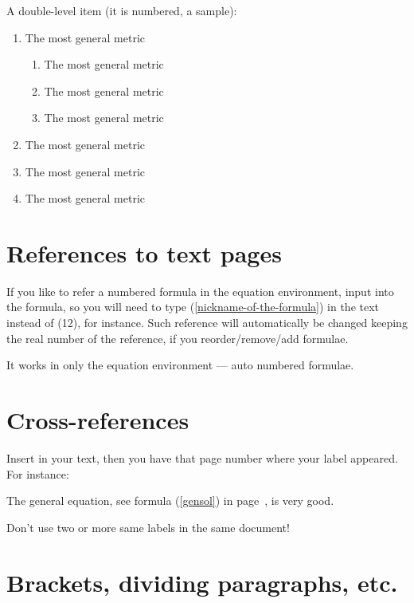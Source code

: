 \documentclass[twoside,final]{article}
\begin{document}
{A double-level item (it is numbered, a sample):
\begin{enumerate}
\item The most general metric
  \begin{enumerate}
  \item The most general metric
  \item The most general metric
  \item The most general metric
  \end{enumerate}
\item The most general metric
\item The most general metric
\item The most general metric
\end{enumerate}


\section{References to text pages}


If you like to refer a numbered formula in the {equation} environment, input
\label{nickname-of-the-formula} into the formula, so you will need to type
(\ref{nickname-of-the-formula}) in the text instead of (12), for instance. Such
reference will automatically be changed keeping the real number of the
reference, if you reorder/remove/add formulae.

It works in only the {equation} environment --- auto numbered formulae.



\section{Cross-references}


Insert \label{myidea} in your text, then you have that page number where your
label \pageref{myidea} appeared. For instance:

The general equation, see formula (\ref{gensol}) in page~\pageref{gensol}, is
very good.

Don't use two or more same labels in the same document!



\section{Brackets, dividing paragraphs, etc.}


}
\end{document}
